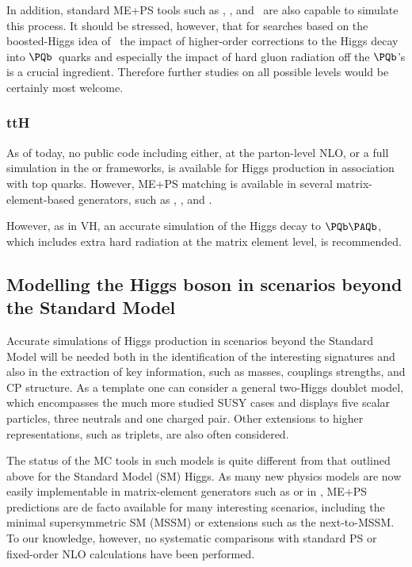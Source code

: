 In addition, standard ME+PS tools such as \alpgen, \MGME, and \sherpa\ are 
also capable to simulate this process.  It should be stressed, however, that 
for searches based on the boosted-Higgs idea of~\cite{Butterworth:2008iy} the 
impact of higher-order corrections to the Higgs decay into $\PQb$~quarks and
especially the impact of hard gluon radiation off the $\PQb$'s is a
crucial ingredient.  Therefore further studies on all possible levels
would be certainly most welcome.


\subsubsection{ttH}

As of today, no public code including either, at the parton-level NLO, or 
a full simulation in the \MCatNLO or \POWHEG frameworks, is available for 
Higgs production in association with top quarks.  However, ME+PS matching is 
available in several matrix-element-based generators, such as \alpgen, 
\sherpa, and \MGME.  

However, as in VH, an accurate simulation of the Higgs decay to $\PQb\PAQb$, 
which includes extra hard radiation at the matrix element level, is 
recommended.

\subsection{Modelling the Higgs boson in scenarios beyond the
Standard Model}

Accurate simulations of Higgs production in scenarios beyond the  
Standard Model will be needed both in the identification of the 
interesting 
signatures and also in the extraction of key information, such as masses,
couplings strengths, and CP structure. As a template one can consider a  
general two-Higgs doublet model, which encompasses the much more studied 
SUSY cases and displays five scalar particles, three neutrals and one charged
pair. Other extensions to higher representations, such as triplets,  
are also often considered.

The status of the MC tools in such models is quite different from that  
outlined above for the Standard Model (SM) Higgs.  As many new physics models are now 
easily implementable in matrix-element generators such as \MGME or in \sherpa, 
ME+PS predictions are de facto available for many interesting scenarios, 
including the minimal supersymmetric SM (MSSM) or extensions such as the 
next-to-MSSM. To our knowledge, however, no 
systematic comparisons with standard PS or fixed-order NLO calculations 
have been performed.

